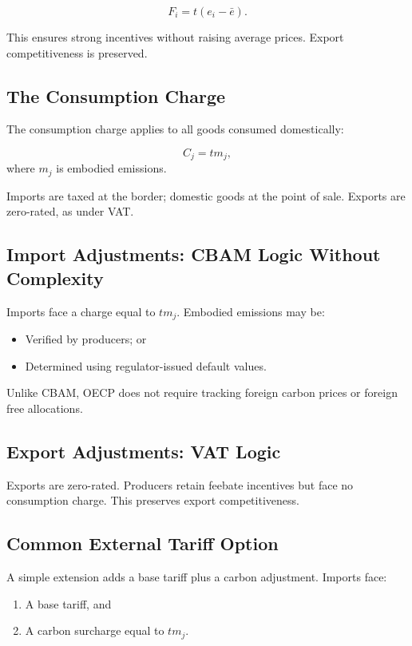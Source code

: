 \documentclass[12pt]{article}
\begin{document}
\begin{equation}
F_i = t (e_i - \bar e).
\end{equation}

This ensures strong incentives without raising average prices. Export competitiveness is preserved.

\subsection{The Consumption Charge}
The consumption charge applies to all goods consumed domestically:

\begin{equation}
C_j = t m_j,
\end{equation}
where $m_j$ is embodied emissions.

Imports are taxed at the border; domestic goods at the point of sale. Exports are zero-rated, as under VAT.

\subsection{Import Adjustments: CBAM Logic Without Complexity}
Imports face a charge equal to $t m_j$. Embodied emissions may be:
\begin{itemize}
    \item Verified by producers; or
    \item Determined using regulator-issued default values.
\end{itemize}

Unlike CBAM, OECP does not require tracking foreign carbon prices or foreign free allocations.

\subsection{Export Adjustments: VAT Logic}
Exports are zero-rated. Producers retain feebate incentives but face no consumption charge. This preserves export competitiveness.

\subsection{Common External Tariff Option}
A simple extension adds a base tariff plus a carbon adjustment. Imports face:

\begin{enumerate}
    \item A base tariff, and
    \item A carbon surcharge equal to $t m_j$.
\end{enumerate}
\end{document}
